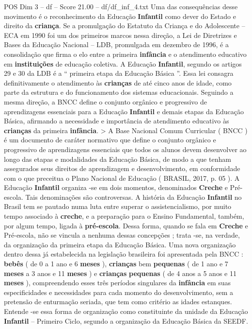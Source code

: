 \begin{textsample}{POS Dim 3 – df – Score 21.00 – df/df\_inf\_4.txt}
Uma das consequências desse movimento é o reconhecimento da Educação \textbf{Infantil} como dever do Estado e direito da \textbf{criança}.
Se a promulgação do Estatuto da Criança e do Adolescente – ECA em 1990 foi um dos primeiros marcos nessa direção, a Lei de Diretrizes e Bases da Educação Nacional – LDB, promulgada em dezembro de 1996, é a consolidação que firma o elo entre a primeira \textbf{infância} e o atendimento educativo em \textbf{instituições} de educação coletiva.
A Educação \textbf{Infantil}, segundo os artigos 29 e 30 da LDB é a “ primeira etapa da Educação Básica ”.
Essa lei consagra definitivamente o atendimento às \textbf{crianças} de até cinco anos de idade, como parte da estrutura e do funcionamento dos sistemas educacionais.
Seguindo a mesma direção, a BNCC define o conjunto orgânico e progressivo de aprendizagens essenciais para a Educação \textbf{Infantil} e demais etapas da Educação Básica, afirmando a necessidade e importância de atendimento educativo às \textbf{crianças} da primeira \textbf{infância}. > A Base Nacional Comum Curricular ( BNCC ) é um documento de caráter normativo que define o conjunto orgânico e progressivo de aprendizagens essenciais que todos os alunos devem desenvolver ao longo das etapas e modalidades da Educação Básica, de modo a que tenham assegurados seus direitos de aprendizagem e desenvolvimento, em conformidade com o que preceitua o Plano Nacional de Educação ( BRASIL, 2017, p. 05 ).
A Educação \textbf{Infantil} organiza -se em dois momentos, denominados \textbf{Creche} e Pré-escola.
Tais denominações são controversas.
A história da Educação \textbf{Infantil} no Brasil tem se pautado numa luta entre superar o assistencialismo, por muito tempo associado à \textbf{creche}, e a preparação para o Ensino Fundamental, também, por algum tempo, ligada à \textbf{pré-escola}.
Dessa forma, quando se fala em \textbf{Creche} e Pré-escola, não se vincula a nenhuma dessas concepções ; trata -se, na verdade, da organização da primeira etapa da Educação Básica.
Uma nova organização dentro dessa já estabelecida na legislação brasileira foi apresentada pela BNCC : \textbf{bebês} ( de 0 a 1 ano e 6 \textbf{meses} ), \textbf{crianças} bem \textbf{pequenas} ( de 1 ano e 7 \textbf{meses} a 3 anos e 11 \textbf{meses} ) e \textbf{crianças} \textbf{pequenas} ( de 4 anos a 5 anos e 11 \textbf{meses} ), compreendendo esses três períodos singulares da \textbf{infância} em suas especificidades e necessidades para cada momento do desenvolvimento, sem a pretensão de enturmação seriada, que tem como critério as idades estanques.
Entende -se essa forma de organização como constituinte da unidade da Educação \textbf{Infantil} – Primeiro Ciclo, segundo a organização da Educação Básica da SEEDF.

\end{textsample}
